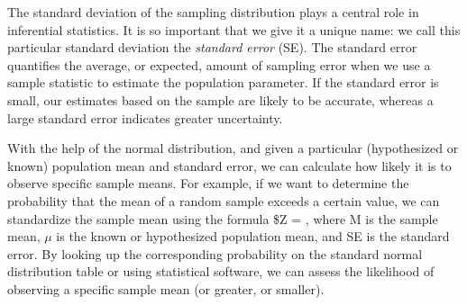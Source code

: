 \documentclass[
  letterpaper,
]{scrbook}
\begin{document}
The standard deviation of the sampling distribution plays a central role
in inferential statistics. It is so important that we give it a unique
name: we call this particular standard deviation the \emph{standard
error} (SE). The standard error quantifies the average, or expected,
amount of sampling error when we use a sample statistic to estimate the
population parameter. If the standard error is small, our estimates
based on the sample are likely to be accurate, whereas a large standard
error indicates greater uncertainty.

With the help of the normal distribution, and given a particular
(hypothesized or known) population mean and standard error, we can
calculate how likely it is to observe specific sample means. For
example, if we want to determine the probability that the mean of a
random sample exceeds a certain value, we can standardize the sample
mean using the formula \$Z = , where M is the sample
mean, \(\mu\) is the known or hypothesized population mean, and SE is
the standard error. By looking up the corresponding probability on the
standard normal distribution table or using statistical software, we can
assess the likelihood of observing a specific sample mean (or greater,
or smaller).
\end{document}
